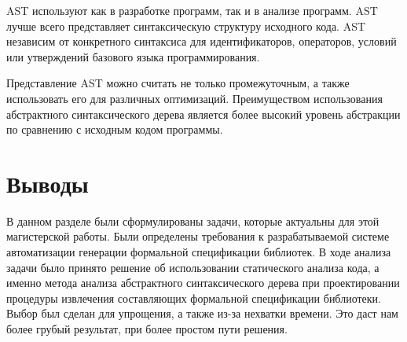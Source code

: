 AST используют как в разработке программ, так и в анализе программ.
AST лучше всего представляет синтаксическую структуру исходного кода. AST независим от конкретного синтаксиса для идентификаторов, операторов, условий или утверждений базового языка программирования.

Представление AST можно считать не только промежуточным, а также использовать его для различных оптимизаций. Преимуществом использования абстрактного синтаксического дерева является более высокий уровень абстракции по сравнению с исходным кодом программы.

\section{Выводы}

В данном разделе были сформулированы задачи, которые актуальны для этой магистерской работы. Были определены требования к разрабатываемой системе автоматизации генерации формальной спецификации библиотек.
В ходе анализа задачи было принято решение об использовании статического анализа кода, а именно метода анализа абстрактного синтаксического дерева при проектировании процедуры извлечения составляющих формальной спецификации библиотеки.
Выбор был сделан для упрощения, а также из-за нехватки времени. Это даст нам более грубый результат, при более простом пути решения.